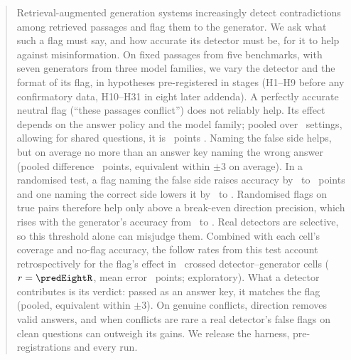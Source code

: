 \begin{abstract}
Retrieval-augmented generation systems increasingly detect contradictions among retrieved passages and flag them to
the generator. We ask what such a flag must say, and how accurate its detector must be, for it to help against
misinformation. On fixed passages from five benchmarks, with seven generators from three model families, we vary the
detector and the format of its flag, in hypotheses pre-registered in stages (H1--H9 before any confirmatory data,
H10--H31 in eight later addenda). A perfectly accurate neutral flag (``these passages conflict'') does not reliably
help. Its effect depends on the answer policy and the model family; pooled over \neuMlK\ settings, allowing
for shared questions, it is \neuMlMu\ points \neuMlCI. Naming the false side helps, but on average no more than
an answer key naming the wrong answer (pooled difference \PoolTwentyThree\ points, equivalent within $\pm$3 on average). In a
randomised test, a flag naming the false side raises accuracy by \hThirtyOneAMin\ to \hThirtyOneAMax\ points and one naming the correct side lowers it by
\ahThirtyOneBMax\ to \ahThirtyOneBMin. Randomised flags on true pairs therefore help only above a break-even direction
precision, which rises with the generator's accuracy from \beMin\ to \beMax. Real detectors are selective, so this
threshold alone can misjudge them. Combined with each cell's coverage and no-flag accuracy, the follow rates from this
test account retrospectively for the flag's effect in \predEightN\ crossed detector--generator cells
($r=\predEightR$, mean error \predEightMae\ points; exploratory). What a
detector contributes is its verdict: passed as an answer key, it matches the flag (pooled, equivalent within $\pm$3). On genuine
conflicts, direction removes valid answers, and when conflicts are rare a real detector's false flags on clean
questions can outweigh its gains. We release the harness, pre-registrations and every run.
\end{abstract}
